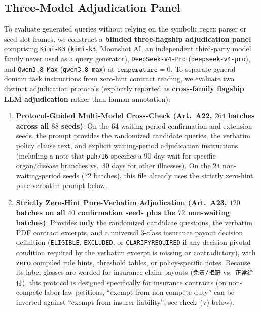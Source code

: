 \documentclass[10pt,twocolumn]{article}
\renewcommand{\_}{\textunderscore\allowbreak}
\begin{document}
\subsection{Three-Model Adjudication Panel}
To evaluate generated queries without relying on the symbolic regex parser or seed slot frames, we construct a \textbf{blinded three-flagship adjudication panel} comprising \texttt{Kimi-K3} (\texttt{kimi-k3}, Moonshot AI, an independent third-party model family never used as a query generator), \texttt{DeepSeek-V4-Pro} (\texttt{deepseek-v4-pro}), and \texttt{Qwen3.8-Max} (\texttt{qwen3.8-max}) at $\texttt{temperature}=0$. To separate general domain task instructions from zero-hint contract reading, we evaluate two distinct adjudication protocols (explicitly reported as \textbf{cross-family flagship LLM adjudication} rather than human annotation):
\begin{enumerate}[leftmargin=*,nosep]
  \item \textbf{Protocol-Guided Multi-Model Cross-Check (Art.~A22, $264$ batches across all $88$ seeds)}: On the $64$ waiting-period confirmation and extension seeds, the prompt provides the randomized candidate queries, the verbatim policy clause text, and explicit waiting-period adjudication instructions (including a note that \texttt{pa\_h716} specifies a 90-day wait for specific organ/disease branches vs.\ 30 days for other illnesses). On the $24$ non-waiting-period seeds ($72$ batches), this file already uses the strictly zero-hint pure-verbatim prompt below.
  \item \textbf{Strictly Zero-Hint Pure-Verbatim Adjudication (Art.~A23, $120$ batches on all $40$ confirmation seeds plus the $72$ non-waiting batches)}: Provides \textbf{only} the randomized candidate questions, the verbatim PDF contract excerpts, and a universal 3-class insurance payout decision definition (\texttt{ELIGIBLE}, \texttt{EXCLUDED}, or \texttt{CLARIFY\_REQUIRED} if any decision-pivotal condition required by the verbatim excerpt is missing or contradictory), with \textbf{zero} compiled rule hints, threshold tables, or policy-specific notes. Because its label glosses are worded for insurance claim payouts (\texttt{免责/拒赔} vs.\ \texttt{正常给付}), this protocol is designed specifically for insurance contracts (on non-compete labor-law petitions, ``exempt from non-compete duty'' can be inverted against ``exempt from insurer liability''; see check~(v) below).
\end{enumerate}
\end{document}
